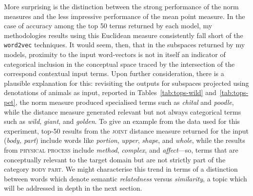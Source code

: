 More surprising is the distinction between the strong performance of the norm measures and the less impressive performance of the mean point measure.  In the case of accuracy among the top 50 terms returned by each model, my methodologies results using this Euclidean measure consistently fall short of the \texttt{word2vec} techniques.  It would seem, then, that in the subspaces returned by my models, proximity to the input word-vectors is not in itself an indicator of categorical inclusion in the conceptual space traced by the intersection of the correspond contextual input terms.  Upon further consideration, there is a plausible explanation for this: revisiting the outputs for subspaces projected using denotations of animals as input, reported in Tables~\ref{tab:tops-wild} and~\ref{tab:tops-pet}, the norm measure produced specialised terms such as \emph{chital} and \emph{poodle}, while the distance measure generated relevant but not always categorical terms such as \emph{wild}, \emph{giant}, and \emph{golden}.  To give an example from the data used for this experiment, top-50 results from the \textsc{joint} distance measure returned for the input (\emph{body, part}) include words like \emph{portion}, \emph{upper}, \emph{shape}, and \emph{whole}, while the results from \textsc{physical process} include \emph{method}, \emph{complex}, and \emph{affect}---so, terms that are conceptually relevant to the target domain but are not strictly part of the category \textsc{body part}.  We might characterise this trend in terms of a distinction between words which denote semantic \emph{relatedness} versus \emph{similarity}, a topic which will be addressed in depth in the next section.

